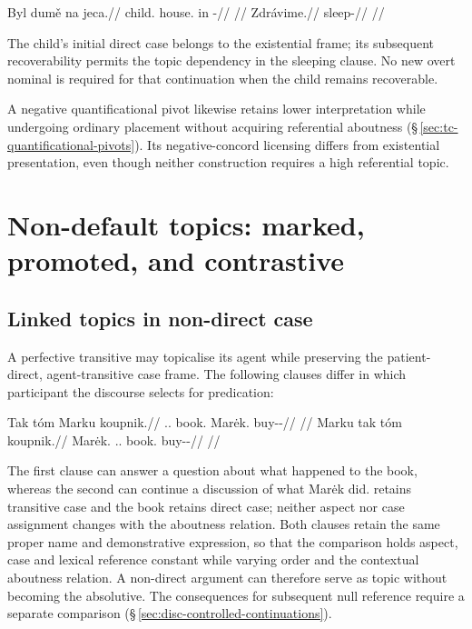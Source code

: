 \pex\label{ex:tc-presentation-continuation}
\a
\begingl
\gla Byl dumě na jeca.//
\glb child.\Dir{} house.\Ind{} in \Exst{}-\Cont{}//
\glft {}
//
\endgl
\a
\begingl
\gla Zdrávime.//
\glb sleep-\Prog{}//
\glft {}
//
\endgl
\xe

The child's initial direct case belongs to the existential frame; its
subsequent recoverability permits the topic dependency in the sleeping
clause. No new overt nominal is required for that continuation when the
child remains recoverable.

A negative quantificational pivot likewise retains lower interpretation
 while undergoing ordinary placement without acquiring referential aboutness (§\,\ref{sec:tc-quantificational-pivots}).
 Its negative-concord licensing differs from existential presentation, even
 though neither construction requires a high referential topic.

\section{Non-default topics: marked, promoted, and contrastive}\label{sec:tc-nondefault}
\subsection{Linked topics in non-direct case}\label{sec:tc-marked-topics}

A perfective transitive may topicalise its agent while preserving the
 patient-direct, agent-transitive case frame. The following clauses differ
 in which participant the discourse selects for predication:

\pex\label{ex:tc-marked-top}
\a\label{ex:tc-neutral-top}%
\begingl
\gla Tak tóm Marku koupnik.//
\glb \Dem{}.\Prox{}.\Dir{} book.\Dir{} Marėk.\Trs{} buy-\Trs{}-\Pf{}//
\glft {}
      //
\endgl
\a\label{ex:tc-marked-agent-top}%
\begingl
\gla Marku tak tóm koupnik.//
\glb Marėk.\Trs{} \Dem{}.\Prox{}.\Dir{} book.\Dir{} buy-\Trs{}-\Pf{}//
\glft {}
      //
\endgl
\xe

\noindent The first clause can answer a question about what happened to the
 book, whereas the second can continue a discussion of what Marėk did.
  retains transitive case and the book retains direct case;
 neither aspect nor case assignment changes with the aboutness relation.
 Both clauses retain the same proper name and demonstrative expression, so
 that the comparison holds aspect, case and lexical reference constant while
 varying order and the contextual aboutness relation. A
 non-direct argument can therefore serve as topic without becoming the
 absolutive. The consequences for subsequent null reference require a
 separate comparison (§\,\ref{sec:disc-controlled-continuations}).

